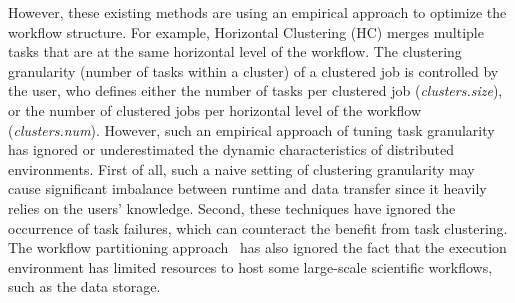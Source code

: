However, these existing methods are using an empirical approach to optimize the workflow structure. For example, Horizontal Clustering (HC) \cite{Singh2008} merges multiple tasks that are at the same horizontal level of the workflow. The clustering granularity (number of tasks within a cluster) of a clustered job is controlled by the user, who defines either the number of tasks per clustered job (\textit{clusters.size}), or the number of clustered jobs per horizontal level of the workflow (\textit{clusters.num}). However, such an empirical approach of tuning task granularity has ignored or underestimated the dynamic characteristics of distributed environments. First of all, such a naive setting of clustering granularity may cause significant imbalance between runtime and data transfer since it heavily relies on the users' knowledge. Second, these techniques have ignored the occurrence of task failures, which can counteract the benefit from task clustering. The workflow partitioning approach~\cite{Rynge2012} has also ignored the fact that the execution environment has limited resources to host some large-scale scientific workflows, such as the data storage. 




